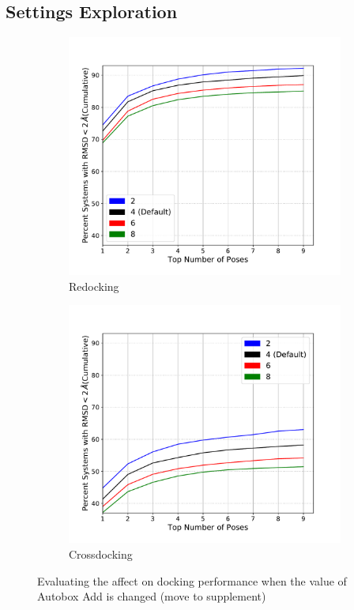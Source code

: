\documentclass[journal=jcisd8,manuscript=article]{achemso}
\begin{document}
\subsection{Settings Exploration}
\begin{figure}    
        \begin{subfigure}[b]{0.48\textwidth}    
		\centering
		\includegraphics[width=\textwidth]{figures/redocking/sweep_autobox_add_line.pdf}
		\caption{Redocking}
		\label{fig:AutoboxAddRedock}
        \end{subfigure}    
        \begin{subfigure}[b]{0.48\textwidth}    
		\centering
		\includegraphics[width=\textwidth]{figures/crossdocking/sweep_autobox_add_line.pdf}
		\caption{Crossdocking}
		\label{fig:AutoboxAddCrossdock}
        \end{subfigure}    
	\caption{Evaluating the affect on docking performance when the value of Autobox Add is changed (move to supplement)}
	\label{fig:AutoboxAdd}
\end{figure}    
\end{document}
